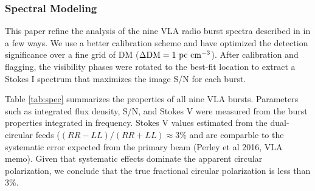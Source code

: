 \documentclass[twocolumn]{aastex61}
\begin{document}
\subsubsection{Spectral Modeling}
\label{sec:spec}

This paper refine the analysis of the nine VLA radio burst spectra described in \citet{LOC} in a few ways. We use a better calibration scheme and have optimized the detection significance over a fine grid of DM ($\Delta \rm{DM}=1\ \rm{pc}\ \rm{cm}^{-3}$). After calibration and flagging, the visibility phases were rotated to the best-fit location \citep[(RA, Dec) $=$ (05h31m58.70s, +33d08m52.5s);][]{LOC} to extract a Stokes I spectrum that maximizes the image S/N for each burst.

Table \ref{tab:spec} summarizes the properties of all nine VLA bursts. Parameters such as integrated flux density, S/N, and Stokes V were measured from the burst properties integrated in frequency. Stokes V values estimated from the dual-circular feeds ($(RR-LL)/(RR+LL)\approx3\%$ and are comparble to the systematic error expected from the primary beam (Perley et al 2016, VLA memo). Given that systematic effects dominate the apparent circular polarization, we conclude that the true fractional circular polarization is less than 3\%.
\end{document}
